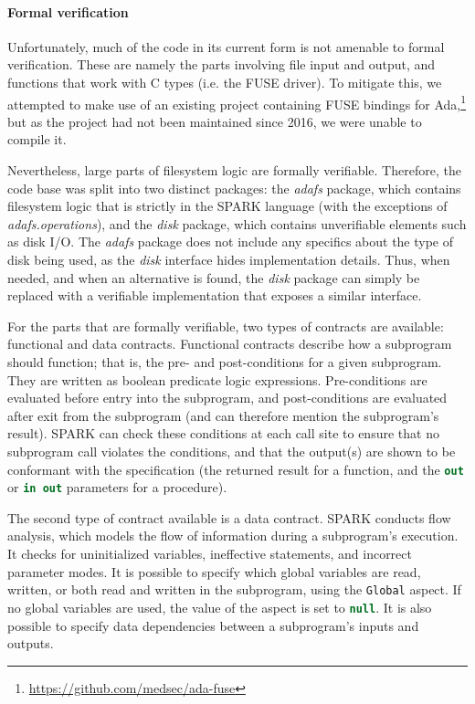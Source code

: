 \paragraph{Formal verification}
Unfortunately, much of the code in its current form is not amenable to formal verification.
These are namely the parts involving file input and output, and functions that work with C types (i.e. the FUSE driver).
To mitigate this, we attempted to make use of an existing project containing FUSE bindings for Ada,\footnote{\url{https://github.com/medsec/ada-fuse}} but as the project had not been maintained since 2016, we were unable to compile it.

Nevertheless, large parts of filesystem logic are formally verifiable.
Therefore, the code base was split into two distinct packages: the \textit{adafs} package, which contains filesystem logic that is strictly in the SPARK language (with the exceptions of \textit{adafs.operations}), and the \textit{disk} package, which contains unverifiable elements such as disk I/O.
The \textit{adafs} package does not include any specifics about the type of disk being used, as the \textit{disk} interface hides implementation details.
Thus, when needed, and when an alternative is found, the \textit{disk} package can simply be replaced with a verifiable implementation that exposes a similar interface.

For the parts that are formally verifiable, two types of contracts are available: functional and data contracts.
Functional contracts describe how a subprogram should function; that is, the pre- and post-conditions for a given subprogram.
They are written as boolean predicate logic expressions.
Pre-conditions are evaluated before entry into the subprogram, and post-conditions are evaluated after exit from the subprogram (and can therefore mention the subprogram's result).
SPARK can check these conditions at each call site to ensure that no subprogram call violates the conditions, and that the output(s) are shown to be conformant with the specification (the returned result for a function, and the \lstinline[language=Ada]{out} or \lstinline[language=Ada]{in out} parameters for a procedure).

The second type of contract available is a data contract.
SPARK conducts flow analysis, which models the flow of information during a subprogram's execution.
It checks for uninitialized variables, ineffective statements, and incorrect parameter modes.
It is possible to specify which global variables are read, written, or both read and written in the subprogram, using the \lstinline[language=Ada]{Global} aspect.
If no global variables are used, the value of the aspect is set to \lstinline[language=Ada]{null}.
It is also possible to specify data dependencies between a subprogram's inputs and outputs.


